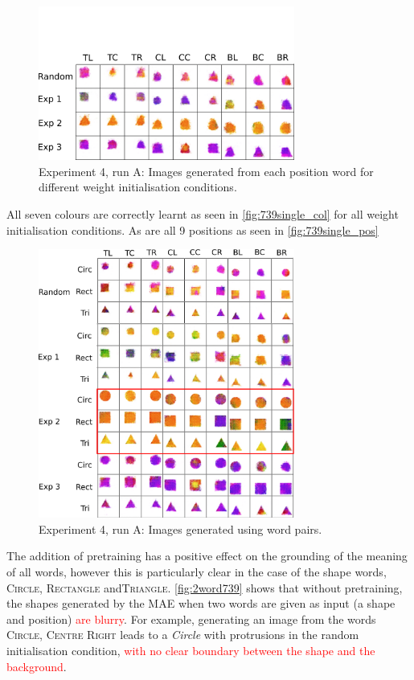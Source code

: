\begin{figure}[h]
\centering
\includegraphics[width=0.75\textwidth]{Figs/shapes/singlelabel739_pos.png}
\caption{Experiment 4, run A: Images generated from each position word for different weight initialisation conditions.}
\label{fig:739single_pos}
\end{figure}

All seven colours are correctly learnt as seen in \autoref{fig:739single_col} for all weight initialisation conditions. As are all 9 positions as seen in \autoref{fig:739single_pos}




\begin{figure}[h!]
\centering
\includegraphics[width=0.75\textwidth]{Figs/shapes/2word739_pos.png}
\caption{Experiment 4, run A: Images generated using word pairs.}
\label{fig:2word739}
\end{figure}

The addition of pretraining has a positive effect on the grounding of the meaning of all words, however this is particularly clear in the case of the shape words, \textsc{Circle}, \textsc{Rectangle} and\textsc{Triangle}. \autoref{fig:2word739} shows that without pretraining, the shapes generated by the \ac{MAE} when two words are given as input (a shape and position) \textcolor{red}{are blurry}. For example, generating an image from the words \textsc{Circle, Centre Right} leads to a \textit{Circle} with protrusions in the random initialisation condition, \textcolor{red}{with no clear boundary between the shape and the background}.


